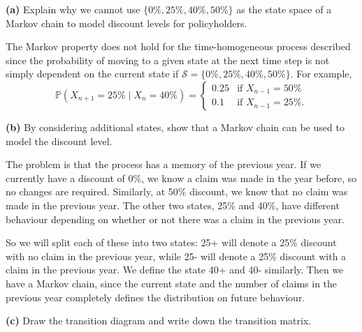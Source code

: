 \documentclass[
  a4paper,
]{article}
\theoremstyle{definition}
\theoremstyle{definition}
\theoremstyle{definition}
\theoremstyle{remark}
\begin{document}
\textbf{(a)} Explain why we cannot use \(\{0\%,25\%,40\%,50\%\}\) as the state space of a Markov chain to model discount levels for policyholders.

\begin{myanswers}

The Markov property does not hold for the time-homogeneous process described since the probability of moving to a given state at the next time step is not simply dependent on the current state if \(\mathcal S=\{0\%,25\%,40\%,50\%\}\). For example,
\[
    \mathbb P(X_{n+1}=25\% \mid X_n= 40\% )=\begin{cases} 
    0.25 & \text{if $X_{n-1}=50\%$}\\
    0.1 & \text{if $X_{n-1}=25\%$.} \end{cases} \]

\end{myanswers}

\textbf{(b)} By considering additional states, show that a Markov chain can be used to model the discount level.

\begin{myanswers}

The problem is that the process has a memory of the previous year.
If we currently have a discount of 0\%, we know a claim was made in the year before, so no changes are required. Similarly, at 50\% discount, we know that no claim was made in the previous year. The other two states, 25\% and 40\%, have different behaviour depending on whether or not there was a claim in the previous year.

So we will split each of these into two states: 25+ will denote a 25\% discount with no claim in the previous year, while 25- will denote a 25\% discount with a claim in the previous year. We define the state 40+ and 40- similarly. Then we have a Markov chain, since the current state and the number of claims in the previous year completely defines the distribution on future behaviour.

\end{myanswers}

\textbf{(c)} Draw the transition diagram and write down the transition matrix.
\end{document}
